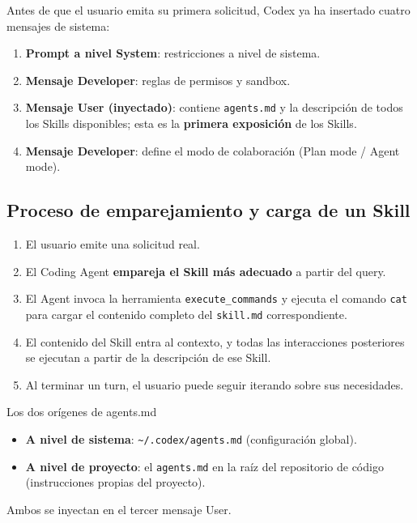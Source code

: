 \documentclass[a4paper]{article}
\begin{document}
Antes de que el usuario emita su primera solicitud, Codex ya ha insertado cuatro mensajes de sistema:

\begin{enumerate}
    \item \textbf{Prompt a nivel System}: restricciones a nivel de sistema.
    \item \textbf{Mensaje Developer}: reglas de permisos y sandbox.
    \item \textbf{Mensaje User (inyectado)}: contiene \texttt{agents.md} y la descripción de todos los Skills disponibles; esta es la \textbf{primera exposición} de los Skills.
    \item \textbf{Mensaje Developer}: define el modo de colaboración (Plan mode / Agent mode).
\end{enumerate}

\subsection{Proceso de emparejamiento y carga de un Skill}

\begin{enumerate}
    \item El usuario emite una solicitud real.
    \item El Coding Agent \textbf{empareja el Skill más adecuado} a partir del query.
    \item El Agent invoca la herramienta \texttt{execute\_commands} y ejecuta el comando \texttt{cat} para cargar el contenido completo del \texttt{skill.md} correspondiente.
    \item El contenido del Skill entra al contexto, y todas las interacciones posteriores se ejecutan a partir de la descripción de ese Skill.
    \item Al terminar un turn, el usuario puede seguir iterando sobre sus necesidades.
\end{enumerate}

\begin{knowledgebox}{Los dos orígenes de agents.md}
\begin{itemize}
    \item \textbf{A nivel de sistema}: \texttt{\~{}/.codex/agents.md} (configuración global).
    \item \textbf{A nivel de proyecto}: el \texttt{agents.md} en la raíz del repositorio de código (instrucciones propias del proyecto).
\end{itemize}
Ambos se inyectan en el tercer mensaje User.
\end{knowledgebox}
\end{document}
